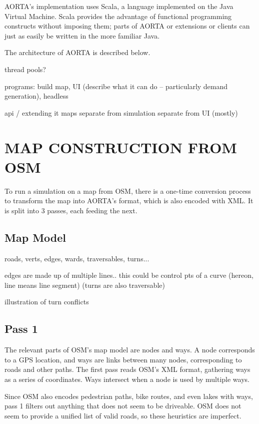 \documentclass[letterpaper, 10 pt, conference]{ieeeconf}  %
\begin{document}
AORTA's implementation uses Scala, a language implemented on the Java Virtual
Machine. Scala provides the advantage of functional programming constructs
without imposing them; parts of AORTA or extensions or clients can just as
easily be written in the more familiar Java.

The architecture of AORTA is described below.

thread pools?

programs: build map, UI (describe what it can do -- particularly demand
generation), headless

api / extending it
maps separate from simulation separate from UI (mostly)


\section{MAP CONSTRUCTION FROM OSM}


To run a simulation on a map from OSM, there is a one-time conversion process to
transform the map into AORTA's format, which is also encoded with XML. It is
split into 3 passes, each feeding the next.

\subsection{Map Model}

roads, verts, edges, wards, traversables, turns...

edges are made up of multiple lines.. this could be control pts of a curve
(hereon, line means line segment)
(turns are also traversable)

illustration of turn conflicts

\subsection{Pass 1}

The relevant parts of OSM's map model are nodes and ways. A node corresponds to
a GPS location, and ways are links between many nodes, corresponding to roads
and other paths. The first pass reads OSM's XML format, gathering ways as a
series of coordinates. Ways intersect when a node is used by multiple ways.

Since OSM also encodes pedestrian paths, bike routes, and even lakes with ways,
pass 1 filters out anything that does not seem to be driveable. OSM does not
seem to provide a unified list of valid roads, so these heuristics are
imperfect.
\end{document}
